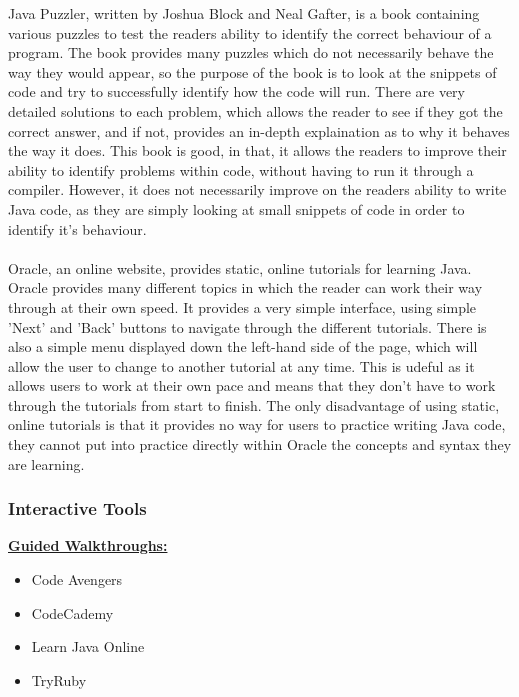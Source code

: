 \documentclass{article}
\begin{document}
Java Puzzler, written by Joshua Block and Neal Gafter, is a book containing various puzzles to test the readers ability to identify the correct behaviour of a program. The book provides many puzzles which do not necessarily behave the way they would appear, so the purpose of the book is to look at the snippets of code and try to successfully identify how the code will run. There are very detailed solutions to each problem, which allows the reader to see if they got the correct answer, and if not, provides an in-depth explaination as to why it behaves the way it does. This book is good, in that, it allows the readers to improve their ability to identify problems within code, without having to run it through a compiler. However, it does not necessarily improve on the readers ability to write Java code, as they are simply looking at small snippets of code in order to identify it's behaviour.\\  
\\
Oracle, an online website, provides static, online tutorials for learning Java. Oracle provides many different topics in which the reader can work their way through at their own speed. It provides a very simple interface, using simple 'Next' and 'Back' buttons to navigate through the different tutorials. There is also a simple menu displayed down the left-hand side of the page, which will allow the user to change to another tutorial at any time. This is udeful as it allows users to work at their own pace and means that they don't have to work through the tutorials from start to finish. The only disadvantage of using static, online tutorials is that it provides no way for users to practice writing Java code, they cannot put into practice directly within Oracle the concepts and syntax they are learning.\\

\subsubsection{Interactive Tools}

\textbf{\underline{Guided Walkthroughs:}}\\

\begin{itemize}
\item Code Avengers
\item CodeCademy
\item Learn Java Online
\item TryRuby
\end{itemize}
\end{document}
